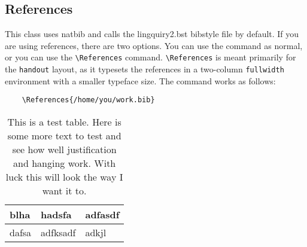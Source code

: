 \documentclass[11pt, tipa, color]{./lingdoc}
\newcommand{\Option}[1]{\texttt{#1}}
\newcommand{\Package}[1]{\textsf{{#1}}}
\begin{document}
  \subsection{References}
  
    This class uses \Package{natbib} and calls the lingquiry2.bst bibstyle file by default. If you are using references, there are two options. You can use the \verb++ command as normal, or you can use the \verb+\References+ command. \verb+\References+ is meant primarily for the \Option{handout} layout, as it typesets the references in a two-column \verb+fullwidth+ environment with a smaller typeface size. The command works as follows:
    
\begin{verbatim}
    \References{/home/you/work.bib}
  \end{verbatim}
  

  
  
  \begin{table}
	\centering
	\begin{tabular}{lll}
	  \toprule
	    blha & hadsfa & adfasdf \\
	  \midrule
	    dafsa & adfksadf & adkjl \\
	  \bottomrule
	\end{tabular}

    \caption{This is a test table. Here is some more text to test and see how well justification and hanging work. With luck this will look the way I want it to.}
  \end{table}

  
\end{document}
